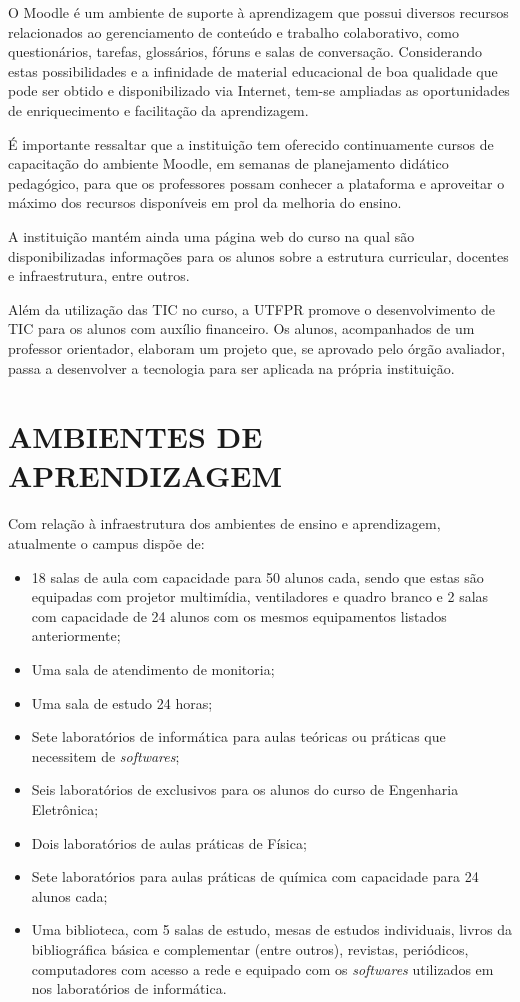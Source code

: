 O Moodle é um ambiente de suporte à aprendizagem que possui diversos recursos relacionados ao gerenciamento de conteúdo e trabalho colaborativo, como questionários, tarefas, glossários, fóruns e salas de conversação. Considerando estas possibilidades e a infinidade de material educacional de boa qualidade que pode ser obtido e disponibilizado via Internet, tem-se ampliadas as oportunidades de enriquecimento e facilitação da aprendizagem.

É importante ressaltar que a instituição tem oferecido continuamente cursos de capacitação do ambiente Moodle, em semanas de planejamento didático pedagógico, para que os professores possam conhecer a plataforma e aproveitar o máximo dos recursos disponíveis em prol da melhoria do ensino.

A instituição mantém ainda uma página web do curso na qual são disponibilizadas informações para os alunos sobre a estrutura curricular, docentes e infraestrutura, entre outros.

Além da utilização das TIC no curso, a UTFPR promove o desenvolvimento de TIC para os alunos com auxílio financeiro. Os alunos, acompanhados de um professor orientador, elaboram um projeto que, se aprovado pelo órgão avaliador, passa a desenvolver a tecnologia para ser aplicada na própria instituição.


\section{AMBIENTES DE APRENDIZAGEM}
\label{sec:amb}

Com relação à infraestrutura dos ambientes de ensino e aprendizagem, atualmente o campus dispõe de:

\begin{itemize}
    \item 18 salas de aula com capacidade para 50 alunos cada, sendo que estas são equipadas com projetor multimídia, ventiladores e quadro branco e 2 salas com capacidade de 24 alunos com os mesmos equipamentos listados anteriormente;
    \item Uma sala de atendimento de monitoria;
    \item Uma sala de estudo 24 horas;
    \item Sete laboratórios de informática para aulas teóricas ou práticas que necessitem de \textit{softwares};
    \item Seis laboratórios de exclusivos para os alunos do curso de Engenharia Eletrônica;
    \item Dois laboratórios de aulas práticas de Física;
    \item Sete laboratórios para aulas práticas de química com capacidade para 24 alunos cada;
    \item Uma biblioteca, com 5 salas de estudo, mesas de estudos individuais, livros da bibliográfica básica e complementar (entre outros), revistas, periódicos, computadores com acesso a rede e equipado com os \textit{softwares} utilizados em nos laboratórios de informática.
\end{itemize}

